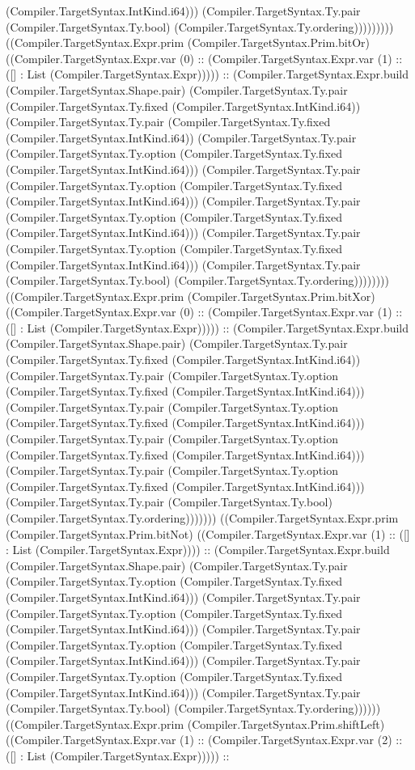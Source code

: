 \documentclass[11pt]{article}
\begin{document}
(Compiler.TargetSyntax.IntKind.i64))) (Compiler.TargetSyntax.Ty.pair (Compiler.TargetSyntax.Ty.bool) (Compiler.TargetSyntax.Ty.ordering))))))))) ((Compiler.TargetSyntax.Expr.prim (Compiler.TargetSyntax.Prim.bitOr) ((Compiler.TargetSyntax.Expr.var (0) :: (Compiler.TargetSyntax.Expr.var (1) :: ([] : List (Compiler.TargetSyntax.Expr))))) :: (Compiler.TargetSyntax.Expr.build (Compiler.TargetSyntax.Shape.pair) (Compiler.TargetSyntax.Ty.pair (Compiler.TargetSyntax.Ty.fixed (Compiler.TargetSyntax.IntKind.i64)) (Compiler.TargetSyntax.Ty.pair (Compiler.TargetSyntax.Ty.fixed (Compiler.TargetSyntax.IntKind.i64)) (Compiler.TargetSyntax.Ty.pair (Compiler.TargetSyntax.Ty.option (Compiler.TargetSyntax.Ty.fixed (Compiler.TargetSyntax.IntKind.i64))) (Compiler.TargetSyntax.Ty.pair (Compiler.TargetSyntax.Ty.option (Compiler.TargetSyntax.Ty.fixed (Compiler.TargetSyntax.IntKind.i64))) (Compiler.TargetSyntax.Ty.pair (Compiler.TargetSyntax.Ty.option (Compiler.TargetSyntax.Ty.fixed (Compiler.TargetSyntax.IntKind.i64))) (Compiler.TargetSyntax.Ty.pair (Compiler.TargetSyntax.Ty.option (Compiler.TargetSyntax.Ty.fixed (Compiler.TargetSyntax.IntKind.i64))) (Compiler.TargetSyntax.Ty.pair (Compiler.TargetSyntax.Ty.bool) (Compiler.TargetSyntax.Ty.ordering)))))))) ((Compiler.TargetSyntax.Expr.prim (Compiler.TargetSyntax.Prim.bitXor) ((Compiler.TargetSyntax.Expr.var (0) :: (Compiler.TargetSyntax.Expr.var (1) :: ([] : List (Compiler.TargetSyntax.Expr))))) :: (Compiler.TargetSyntax.Expr.build (Compiler.TargetSyntax.Shape.pair) (Compiler.TargetSyntax.Ty.pair (Compiler.TargetSyntax.Ty.fixed (Compiler.TargetSyntax.IntKind.i64)) (Compiler.TargetSyntax.Ty.pair (Compiler.TargetSyntax.Ty.option (Compiler.TargetSyntax.Ty.fixed (Compiler.TargetSyntax.IntKind.i64))) (Compiler.TargetSyntax.Ty.pair (Compiler.TargetSyntax.Ty.option (Compiler.TargetSyntax.Ty.fixed (Compiler.TargetSyntax.IntKind.i64))) (Compiler.TargetSyntax.Ty.pair (Compiler.TargetSyntax.Ty.option (Compiler.TargetSyntax.Ty.fixed (Compiler.TargetSyntax.IntKind.i64))) (Compiler.TargetSyntax.Ty.pair (Compiler.TargetSyntax.Ty.option (Compiler.TargetSyntax.Ty.fixed (Compiler.TargetSyntax.IntKind.i64))) (Compiler.TargetSyntax.Ty.pair (Compiler.TargetSyntax.Ty.bool) (Compiler.TargetSyntax.Ty.ordering))))))) ((Compiler.TargetSyntax.Expr.prim (Compiler.TargetSyntax.Prim.bitNot) ((Compiler.TargetSyntax.Expr.var (1) :: ([] : List (Compiler.TargetSyntax.Expr)))) :: (Compiler.TargetSyntax.Expr.build (Compiler.TargetSyntax.Shape.pair) (Compiler.TargetSyntax.Ty.pair (Compiler.TargetSyntax.Ty.option (Compiler.TargetSyntax.Ty.fixed (Compiler.TargetSyntax.IntKind.i64))) (Compiler.TargetSyntax.Ty.pair (Compiler.TargetSyntax.Ty.option (Compiler.TargetSyntax.Ty.fixed (Compiler.TargetSyntax.IntKind.i64))) (Compiler.TargetSyntax.Ty.pair (Compiler.TargetSyntax.Ty.option (Compiler.TargetSyntax.Ty.fixed (Compiler.TargetSyntax.IntKind.i64))) (Compiler.TargetSyntax.Ty.pair (Compiler.TargetSyntax.Ty.option (Compiler.TargetSyntax.Ty.fixed (Compiler.TargetSyntax.IntKind.i64))) (Compiler.TargetSyntax.Ty.pair (Compiler.TargetSyntax.Ty.bool) (Compiler.TargetSyntax.Ty.ordering)))))) ((Compiler.TargetSyntax.Expr.prim (Compiler.TargetSyntax.Prim.shiftLeft) ((Compiler.TargetSyntax.Expr.var (1) :: (Compiler.TargetSyntax.Expr.var (2) :: ([] : List (Compiler.TargetSyntax.Expr))))) :: 
\end{document}

